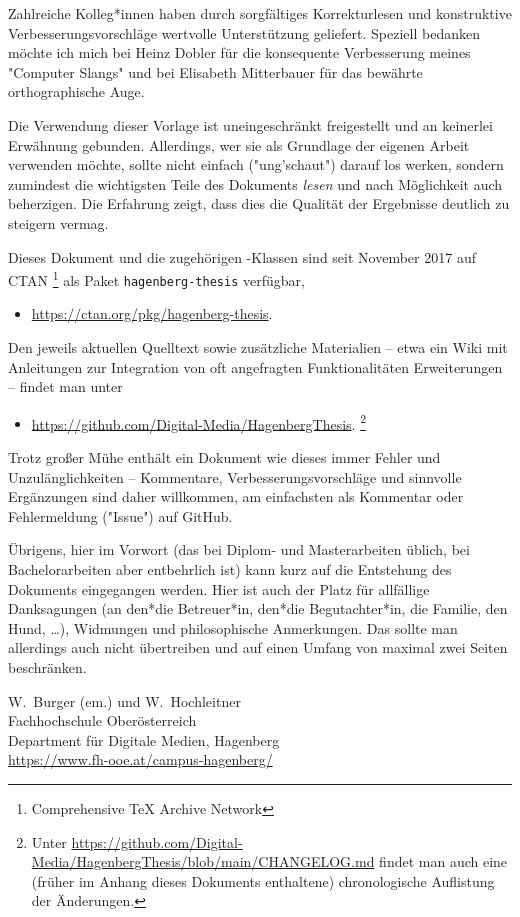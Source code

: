 Zahlreiche Kolleg*innen haben durch sorgfältiges Korrekturlesen und
konstruktive Verbesserungsvorschläge wertvolle Unterstützung geliefert.
Speziell bedanken möchte ich mich bei Heinz Dobler für die konsequente
Verbesserung meines "Computer Slangs" und bei Elisabeth Mitterbauer für das
bewährte orthographische Auge.

Die Verwendung dieser Vorlage ist uneingeschränkt freigestellt und an
keinerlei Erwähnung gebunden. Allerdings, wer sie als Grundlage der eigenen
Arbeit verwenden möchte, sollte nicht einfach ("ung'schaut") darauf los
werken, sondern zumindest die wichtigsten Teile des Dokuments \emph{lesen}
und nach Möglichkeit auch beherzigen. Die Erfahrung zeigt, dass dies die
Qualität der Ergebnisse deutlich zu steigern vermag.

Dieses Dokument und die zugehörigen \latex-Klassen sind seit November 2017
auf CTAN%
\footnote{Comprehensive TeX Archive Network} 
als Paket \texttt{hagenberg-thesis} verfügbar,
%
\begin{itemize}
  \item[]\url{https://ctan.org/pkg/hagenberg-thesis}.
\end{itemize}
%
Den jeweils aktuellen Quelltext sowie zusätzliche Materialien -- etwa ein Wiki
mit Anleitungen zur Integration von oft angefragten Funktionalitäten \bzw
Erweiterungen -- findet man unter
%
\begin{itemize}
  \item[]\url{https://github.com/Digital-Media/HagenbergThesis}.%
  \footnote{Unter
  \url{https://github.com/Digital-Media/HagenbergThesis/blob/main/CHANGELOG.md}
  findet man auch eine (früher im Anhang dieses Dokuments enthaltene)
  chronologische Auflistung der Änderungen.}
\end{itemize}

\noindent
Trotz großer Mühe enthält ein Dokument wie dieses immer Fehler und
Unzulänglichkeiten -- Kommentare, Verbesserungsvorschläge und sinnvolle
Ergänzungen sind daher willkommen, am einfachsten als Kommentar oder
Fehlermeldung ("Issue") auf GitHub.

Übrigens, hier im Vorwort (das bei Diplom- und Masterarbeiten üblich, bei
Bachelor\-arbeiten aber entbehrlich ist) kann kurz auf die Entstehung des
Dokuments eingegangen werden. Hier ist auch der Platz für allfällige
Danksagungen (\zB an den*die Betreuer*in, den*die Begutachter*in, die
Familie, den Hund, \ldots), Widmungen und philosophische Anmerkungen. Das
sollte man allerdings auch nicht übertreiben und auf einen Umfang von maximal
zwei Seiten beschränken.

\vspace{6ex}
\noindent
W.\ Burger (em.) und W.\ Hochleitner\\[1ex]
Fachhochschule Oberösterreich\\
Department für Digitale Medien, Hagenberg\\
\url{https://www.fh-ooe.at/campus-hagenberg/}
